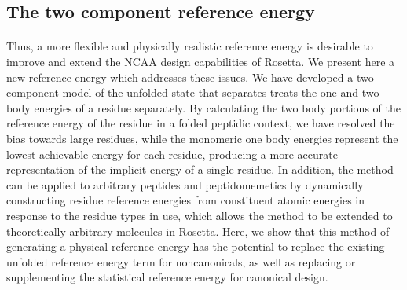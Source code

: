 \subsection{The two component reference energy}
\paragraph{}
Thus, a more flexible and physically realistic reference energy is desirable to improve and extend the NCAA design capabilities of Rosetta.
We present here a new reference energy which addresses these issues.
We have developed a two component model of the unfolded state that separates treats the one and two body energies of a residue separately.
By calculating the two body portions of the reference energy of the residue in a folded peptidic context, we have resolved the bias towards large residues, while the monomeric one body energies represent the lowest achievable energy for each residue, producing a more accurate representation of the implicit energy of a single residue.
In addition, the method can be applied to arbitrary peptides and peptidomemetics by dynamically constructing residue reference energies from constituent atomic energies in response to the residue types in use, which allows the method to be extended to theoretically arbitrary molecules in Rosetta.
Here, we show that this method of generating a physical reference energy has the potential to replace the existing unfolded reference energy term for noncanonicals, as well as replacing or supplementing the statistical reference energy for canonical design.


